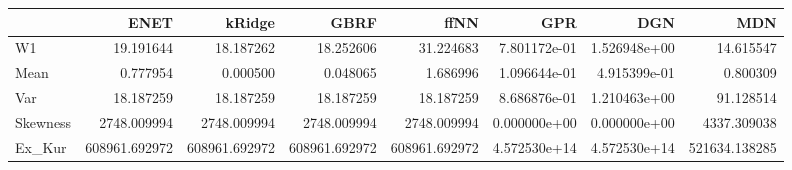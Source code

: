 \begin{tabular}{lrrrrrrr}
\toprule
{} &           ENET &         kRidge &           GBRF &           ffNN &           GPR &           DGN &            MDN \\
\midrule
W1       &      19.191644 &      18.187262 &      18.252606 &      31.224683 &  7.801172e-01 &  1.526948e+00 &      14.615547 \\
Mean     &       0.777954 &       0.000500 &       0.048065 &       1.686996 &  1.096644e-01 &  4.915399e-01 &       0.800309 \\
Var      &      18.187259 &      18.187259 &      18.187259 &      18.187259 &  8.686876e-01 &  1.210463e+00 &      91.128514 \\
Skewness &    2748.009994 &    2748.009994 &    2748.009994 &    2748.009994 &  0.000000e+00 &  0.000000e+00 &    4337.309038 \\
Ex\_Kur   &  608961.692972 &  608961.692972 &  608961.692972 &  608961.692972 &  4.572530e+14 &  4.572530e+14 &  521634.138285 \\
\bottomrule
\end{tabular}
